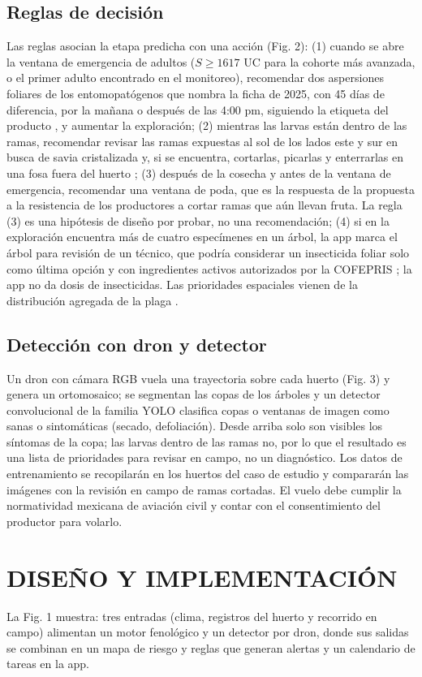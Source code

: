 \documentclass[conference]{IEEEtran}
\begin{document}
\subsection{Reglas de decisión}
Las reglas asocian la etapa predicha con una acción (Fig. 2): (1) cuando se abre la ventana de emergencia de adultos ($S \ge 1617$ UC para la cohorte más avanzada, o el primer adulto encontrado en el monitoreo), recomendar dos aspersiones foliares de los entomopatógenos que nombra la ficha de 2025, con 45 días de diferencia, por la mañana o después de las 4:00 pm, siguiendo la etiqueta del producto \cite{ref6}, y aumentar la exploración; (2) mientras las larvas están dentro de las ramas, recomendar revisar las ramas expuestas al sol de los lados este y sur \cite{ref6} en busca de savia cristalizada y, si se encuentra, cortarlas, picarlas y enterrarlas en una fosa fuera del huerto \cite{ref6}; (3) después de la cosecha y antes de la ventana de emergencia, recomendar una ventana de poda, que es la respuesta de la propuesta a la resistencia de los productores a cortar ramas que aún llevan fruta. La regla (3) es una hipótesis de diseño por probar, no una recomendación; (4) si en la exploración encuentra más de cuatro especímenes en un árbol, la app marca el árbol para revisión de un técnico, que podría considerar un insecticida foliar solo como última opción y con ingredientes activos autorizados por la COFEPRIS \cite{ref6}; la app no da dosis de insecticidas. Las prioridades espaciales vienen de la distribución agregada de la plaga \cite{ref8}.

\subsection{Detección con dron y detector}
Un dron con cámara RGB vuela una trayectoria sobre cada huerto (Fig. 3) y genera un ortomosaico; se segmentan las copas de los árboles y un detector convolucional de la familia YOLO clasifica copas o ventanas de imagen como sanas o sintomáticas (secado, defoliación). Desde arriba solo son visibles los síntomas de la copa; las larvas dentro de las ramas no, por lo que el resultado es una lista de prioridades para revisar en campo, no un diagnóstico. Los datos de entrenamiento se recopilarán en los huertos del caso de estudio y compararán las imágenes con la revisión en campo de ramas cortadas. El vuelo debe cumplir la normatividad mexicana de aviación civil y contar con el consentimiento del productor para volarlo.
\newpage
\section{DISEÑO Y IMPLEMENTACIÓN}
La Fig. 1 muestra: tres entradas (clima, registros del huerto y recorrido en campo) alimentan un motor fenológico y un detector por dron, donde sus salidas se combinan en un mapa de riesgo y reglas que generan alertas y un calendario de tareas en la app.
\end{document}
